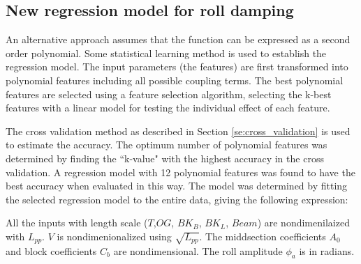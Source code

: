 \subsection{New regression model for roll damping}
An alternative approach assumes that the function can be expressed as a second order polynomial. Some statistical learning method is used to establish the regression model. The input parameters (the features) are first transformed into polynomial features including all possible coupling terms. The best polynomial features are selected using a feature selection algorithm, selecting the k-best features with a linear model for testing the individual effect of each feature. 

The cross validation method as described in Section \ref{se:cross_validation} is used to estimate the accuracy. The optimum number of polynomial features was determined by finding the ``k-value" with the highest accuracy in the cross validation. A regression model with 12 polynomial features was found to have the best accuracy when evaluated in this way. The model was determined by fitting the selected regression model to the entire data, giving the following expression:


All the inputs with length scale ($T$,$OG$, $BK_{B}$, $BK_{L}$, $Beam$) are nondimenilaized with $L_{pp}$. $V$ is nondimenionalized using $\sqrt{L_{pp}}$. The middsection coefficients $A_0$ and block coefficients $C_b$ are nondimensional. The roll amplitude $\phi_a$ is in radians.


